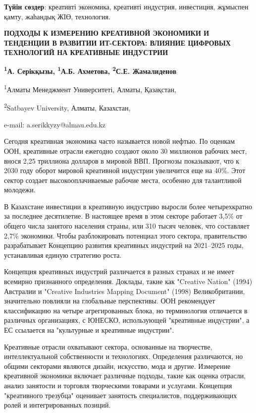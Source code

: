 {\bfseries Түйін сөздер}: креативті экономика, креативті индустрия,
инвестиция, жұмыспен қамту, жаһандық ЖІӨ, технология.

\begin{center}
{\large\bfseries ПОДХОДЫ К ИЗМЕРЕНИЮ КРЕАТИВНОЙ ЭКОНОМИКИ И ТЕНДЕНЦИИ В РАЗВИТИИ
ИТ-СЕКТОРА: ВЛИЯНИЕ ЦИФРОВЫХ ТЕХНОЛОГИЙ НА КРЕАТИВНЫЕ ИНДУСТРИИ}

{\bfseries \textsuperscript{1}А. Серікқызы\envelope, \textsuperscript{1}А.Б. Ахметова, \textsuperscript{2}С.Е. Жамалиденов}

\textsuperscript{1}Алматы Менеджмент Университеті, Алматы, Қазақстан,

\textsuperscript{2}Satbayev University, Алматы, Казахстан,

e-mail: a.serikkyzy@almau.edu.kz
\end{center}

Сегодня креативная экономика часто называется новой нефтью. По оценкам
ООН, креативные отрасли ежегодно создают около 30 миллионов рабочих
мест, внося 2,25 триллиона долларов в мировой ВВП. Прогнозы показывают,
что к 2030 году оборот мировой креативной индустрии увеличится еще на
40\%. Этот сектор создает высокооплачиваемые рабочие места, особенно для
талантливой молодежи.

В Казахстане инвестиции в креативную индустрию выросли более
четырехкратно за последнее десятилетие. В настоящее время в этом секторе
работает 3,5\% от общего числа занятого населения страны, или 310 тысяч
человек, что составляет 2,7\% экономики. Чтобы разблокировать потенциал
этого сектора, правительство разрабатывает Концепцию развития креативных
индустрий на 2021--2025 годы, устанавливая единую стратегию роста.

Концепция креативных индустрий различается в разных странах и не имеет
всемирно признанного определения. Доклады, такие как "Creative Nation"
(1994) Австралии и "Creative Industries Mapping Document" (1998)
Великобритании, значительно повлияли на глобальные перспективы. ООН
рекомендует классификацию на четыре агрегированных блока, но
терминология отличается в различных организациях, с ЮНЕСКО, использующей
"креативные индустрии", а ЕС ссылается на "культурные и креативные
индустрии".

Креативные отрасли охватывают сектора, основанные на творчестве,
интеллектуальной собственности и технологиях. Определения различаются,
но общими секторами являются дизайн, искусство, мода и другие. Измерение
креативной экономики включает различные подходы, такие как оценка
отрасли, анализ занятости и торговля творческими товарами и услугами.
Концепция "креативного трезубца" оценивает занятость специалистов,
поддерживающих ролей и интегрированных позиций.

